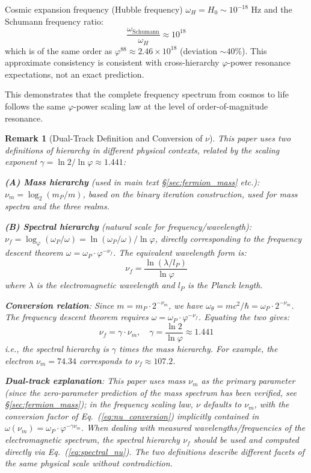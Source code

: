 \documentclass[12pt,a4paper,twocolumn]{article}
\renewcommand{\phi}{\varphi}
\newtheorem{remark}[theorem]{Remark}
\begin{document}
Cosmic expansion frequency (Hubble frequency) $\omega_{H} = H_0 \sim 10^{-18}$ Hz and the Schumann frequency ratio:
\begin{equation}
\frac{\omega_{\text{Schumann}}}{\omega_{H}} \approx 10^{18}
\end{equation}
which is of the same order as $\phi^{88} \approx 2.46 \times 10^{18}$ (deviation $\sim 40\%$). This approximate consistency is consistent with cross-hierarchy $\phi$-power resonance expectations, not an exact prediction.

This demonstrates that the complete frequency spectrum from cosmos to life follows the same $\phi$-power scaling law at the level of order-of-magnitude resonance.

\begin{remark}[Dual-Track Definition and Conversion of $\nu$]
\label{rmk:nu_dual_track}
This paper uses two definitions of hierarchy in different physical contexts, related by the scaling exponent $\gamma = \ln 2/\ln\phi \approx 1.441$:

\textbf{(A) Mass hierarchy} (used in main text \S\ref{sec:fermion_mass} etc.): $\nu_m = \log_2(m_P/m)$, based on the binary iteration construction, used for mass spectra and the three realms.

\textbf{(B) Spectral hierarchy} (natural scale for frequency/wavelength): $\nu_f = \log_\phi(\omega_P/\omega) = \ln(\omega_P/\omega)/\ln\phi$, directly corresponding to the frequency descent theorem $\omega = \omega_P \cdot \phi^{-\nu_f}$. The equivalent wavelength form is:
\begin{equation}
\nu_f = \frac{\ln(\lambda/l_P)}{\ln\phi}
\label{eq:spectral_nu}
\end{equation}
where $\lambda$ is the electromagnetic wavelength and $l_P$ is the Planck length.

\textbf{Conversion relation}: Since $m = m_P \cdot 2^{-\nu_m}$, we have $\omega_\theta = mc^2/\hbar = \omega_P \cdot 2^{-\nu_m}$. The frequency descent theorem requires $\omega = \omega_P \cdot \phi^{-\nu_f}$. Equating the two gives:
\begin{equation}
\nu_f = \gamma \cdot \nu_m, \quad \gamma = \frac{\ln 2}{\ln\phi} \approx 1.441
\label{eq:nu_conversion}
\end{equation}
i.e., the spectral hierarchy is $\gamma$ times the mass hierarchy. For example, the electron $\nu_m = 74.34$ corresponds to $\nu_f \approx 107.2$.

\textbf{Dual-track explanation}: This paper uses mass $\nu_m$ as the primary parameter (since the zero-parameter prediction of the mass spectrum has been verified, see \S\ref{sec:fermion_mass}); in the frequency scaling law, $\nu$ defaults to $\nu_m$, with the conversion factor of Eq.~(\ref{eq:nu_conversion}) implicitly contained in $\omega(\nu_m) = \omega_P \cdot \phi^{-\gamma\nu_m}$. When dealing with measured wavelengths/frequencies of the electromagnetic spectrum, the spectral hierarchy $\nu_f$ should be used and computed directly via Eq.~(\ref{eq:spectral_nu}). The two definitions describe different facets of the same physical scale without contradiction.


\end{remark}
\end{document}
